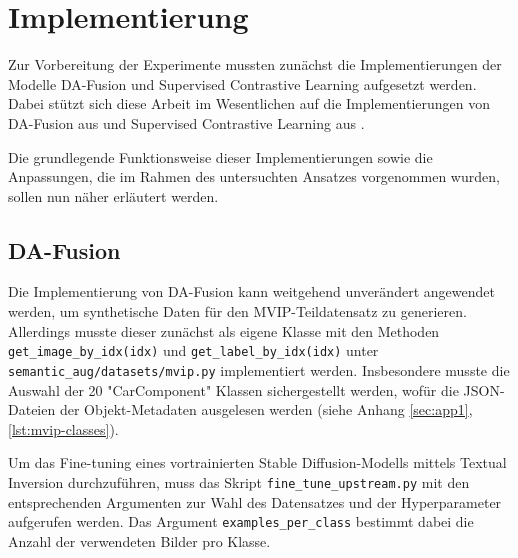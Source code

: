 \section{Implementierung} \label{sec:implementation}


Zur Vorbereitung der Experimente mussten zunächst die Implementierungen der Modelle DA-Fusion und Supervised Contrastive Learning aufgesetzt werden. Dabei stützt sich diese Arbeit im Wesentlichen auf die Implementierungen von DA-Fusion aus \parencite{Trabucco2024dafusiongithub} und Supervised Contrastive Learning aus \parencite{Tian2023supcongithub}.

Die grundlegende Funktionsweise dieser Implementierungen sowie die Anpassungen, die im Rahmen des untersuchten Ansatzes vorgenommen wurden, sollen nun näher erläutert werden.

\subsection{DA-Fusion} \label{subsec:da-fusion-implementation}

Die Implementierung von DA-Fusion kann weitgehend unverändert angewendet werden, um synthetische Daten für den MVIP-Teildatensatz zu generieren. Allerdings musste dieser zunächst als eigene Klasse mit den Methoden \lstinline{get_image_by_idx(idx)} und \lstinline{get_label_by_idx(idx)} unter \lstinline{semantic_aug/datasets/mvip.py} implementiert werden. Insbesondere musste die Auswahl der 20 "CarComponent" Klassen sichergestellt werden, wofür die JSON-Dateien der Objekt-Metadaten ausgelesen werden (siehe Anhang \ref{sec:app1}, \autoref{lst:mvip-classes}). %

Um das Fine-tuning eines vortrainierten Stable Diffusion-Modells mittels Textual Inversion durchzuführen, muss das Skript \lstinline{fine_tune_upstream.py} mit den entsprechenden Argumenten zur Wahl des Datensatzes und der Hyperparameter aufgerufen werden. Das Argument \lstinline{examples_per_class} bestimmt dabei die Anzahl der verwendeten Bilder pro Klasse.

